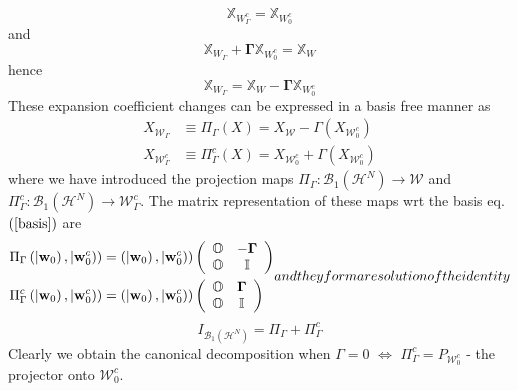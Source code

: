 \documentclass[aps,preprint]{revtex4}%
\begin{document}
\begin{equation}
\mathbb{X}_{W_{\Gamma}^{c}}=\mathbb{X}_{W_{0}^{c}}%
\end{equation}
and%
\begin{equation}
\mathbb{X}_{W_{\Gamma}}+\mathbf{\Gamma}\mathbb{X}_{W_{0}^{c}}=\mathbb{X}_{W}%
\end{equation}
hence%
\begin{equation}
\mathbb{X}_{W_{\Gamma}}=\mathbb{X}_{W}-\mathbf{\Gamma}\mathbb{X}_{W_{0}^{c}}%
\end{equation}
These expansion coefficient changes can be expressed in a basis free manner as%
\begin{align}
X_{\mathcal{W}_{\Gamma}}  &  \equiv\Pi_{\Gamma}\left(  X\right)
=X_{\mathcal{W}}-\Gamma\left(  X_{\mathcal{W}_{0}^{c}}\right) \nonumber\\
X_{\mathcal{W}_{\Gamma}^{c}}  &  \equiv\Pi_{\Gamma}^{c}\left(  X\right)
=X_{\mathcal{W}_{0}^{c}}+\Gamma\left(  X_{\mathcal{W}_{0}^{c}}\right)
\label{Csubspace}%
\end{align}
where we have introduced the projection maps $\Pi_{\Gamma}:\mathcal{B}%
_{1}\left(  \mathcal{H}^{N}\right)  \rightarrow\mathcal{W}$ and $\Pi_{\Gamma
}^{c}:\mathcal{B}_{1}\left(  \mathcal{H}^{N}\right)  \rightarrow
\mathcal{W}_{\Gamma}^{c}$. The matrix representation of these maps wrt the
basis eq. $\left(  \ref{basis}\right)  $ are
\begin{subequations}
\begin{align}
\Pi_{\Gamma}\left(  \left\vert \mathbf{w}_{0}\right)  ,\left\vert
\mathbf{w}_{0}^{c}\right)  \right)   &  =\left(  \left\vert \mathbf{w}%
_{0}\right)  ,\left\vert \mathbf{w}_{0}^{c}\right)  \right)  \left(
\begin{array}
[c]{cc}%
\mathbb{O} & -\mathbf{\Gamma}\\
\mathbb{O} & \mathbb{I}%
\end{array}
\right) \\
\Pi_{\Gamma}^{c}\left(  \left\vert \mathbf{w}_{0}\right)  ,\left\vert
\mathbf{w}_{0}^{c}\right)  \right)   &  =\left(  \left\vert \mathbf{w}%
_{0}\right)  ,\left\vert \mathbf{w}_{0}^{c}\right)  \right)  \left(
\begin{array}
[c]{cc}%
\mathbb{O} & \mathbf{\Gamma}\\
\mathbb{O} & \mathbb{I}%
\end{array}
\right)
\end{align}
and they form a resolution of the identity
\end{subequations}
\begin{equation}
I_{\mathcal{B}_{1}\left(  \mathcal{H}^{N}\right)  }=\Pi_{\Gamma}+\Pi_{\Gamma
}^{c}%
\end{equation}
Clearly we obtain the canonical decomposition when $\Gamma=0$ $\Leftrightarrow
$ $\Pi_{\Gamma}^{c}=P_{\mathcal{W}_{0}^{c}}$ - the projector onto
$\mathcal{W}_{0}^{c}$.
\end{document}

